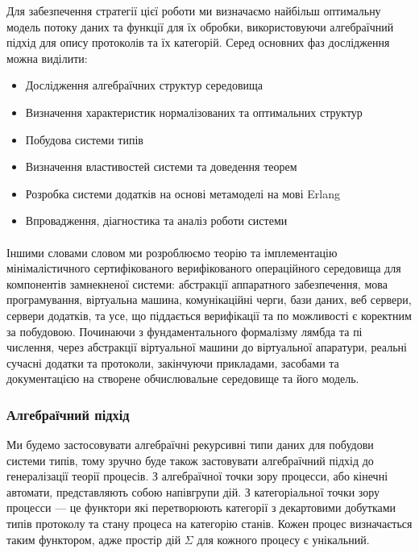 \documentclass[11pt,oneside]{article}
\begin{document}
  Для забезпечення стратегії цієї роботи ми визначаємо найбільш оптимальну модель
  потоку даних та функції для їх обробки, використовуючи алгебраїчний підхід
  для опису протоколів та їх категорій. Серед основних фаз дослідження можна виділити:

\begin{itemize}
   \item Дослідження алгебраїчних структур середовища
   \item Визначення характеристик нормалізованих та оптимальних структур
   \item Побудова системи типів
   \item Визначення властивостей системи та доведення теорем
   \item Розробка системи додатків на основі метамоделі на мові Erlang
   \item Впровадження, діагностика та аналіз роботи системи
\end{itemize}

   \paragraph{}
   Іншими словами словом ми розроблюємо теорію та імплементацію мінімалістичного
   сертифікованого верифікованого операційного середовища для компонентів замнекненої системи:
   абстракції аппаратного забезпечення, мова програмування, віртуальна машина, комунікаційні
   черги, бази даних, веб сервери, сервери додатків, та усе, що піддається верифікації та по
   можливості є коректним за побудовою. Починаючи з фундаментального формалізму лямбда та пі числення,
   через абстракції віртуальної машини до віртуальної апаратури, реальні сучасні додатки та протоколи,
   закінчуючи прикладами, засобами та документацією на створене обчислювальне середовище та його модель.\\

\newpage
   \subsubsection*{Алгебраїчний підхід}

   Ми будемо застосовувати алгебраїчні рекурсивні типи даних для побудови системи типів, тому
   зручно буде також застовувати алгебраїчний підхід до генералізації теорії процесів.
   З алгебраїчної точки зору процесси, або кінечні автомати, представляють собою напівгрупи дій.
   З категоріальної точки зору процесси --- це функтори які перетворюють категорії з декартовими добутками
   типів протоколу та стану процеса на категорію станів. Кожен процес визначається таким функтором, адже
   простір дій $\Sigma$ для кожного процесу є унікальний.
\end{document}

